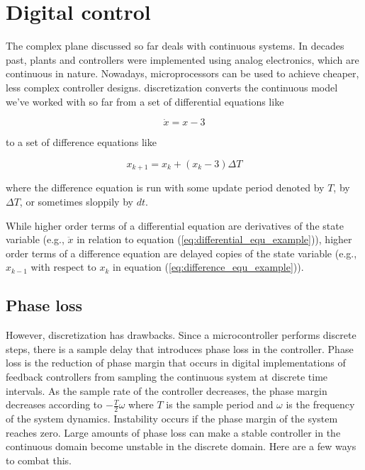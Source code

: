 
\chapter{Digital control} \label{ch:digital_control}

The complex plane discussed so far deals with continuous \glspl{system}. In
decades past, \glspl{plant} and controllers were implemented using analog
electronics, which are continuous in nature. Nowadays, microprocessors can be
used to achieve cheaper, less complex controller designs. \Gls{discretization}
converts the continuous \gls{model} we've worked with so far from a set of
differential equations like

\begin{equation}
  \dot{x} = x - 3 \label{eq:differential_equ_example}
\end{equation}

to a set of difference equations like

\begin{equation}
  x_{k+1} = x_k + (x_k - 3) \Delta T \label{eq:difference_equ_example}
\end{equation}

where the difference equation is run with some update period denoted by $T$, by
$\Delta T$, or sometimes sloppily by $dt$.

While higher order terms of a differential equation are derivatives of the
\gls{state} variable (e.g., $\ddot{x}$ in relation to equation
(\ref{eq:differential_equ_example})), higher order terms of a difference
equation are delayed copies of the \gls{state} variable (e.g., $x_{k-1}$ with
respect to $x_k$ in equation (\ref{eq:difference_equ_example})).

\section{Phase loss} \label{sec:phase_loss}

However, \gls{discretization} has drawbacks. Since a microcontroller performs
discrete steps, there is a sample delay that introduces phase loss in the
controller. Phase loss is the reduction of \gls{phase margin} that occurs in
digital implementations of feedback controllers from sampling the continuous
\gls{system} at discrete time intervals. As the sample rate of the controller
decreases, the \gls{phase margin} decreases according to $-\frac{T}{2}\omega$
where $T$ is the sample period and $\omega$ is the frequency of the \gls{system}
dynamics. Instability occurs if the \gls{phase margin} of the \gls{system}
reaches zero. Large amounts of phase loss can make a stable controller in the
continuous domain become unstable in the discrete domain. Here are a few ways to
combat this.


